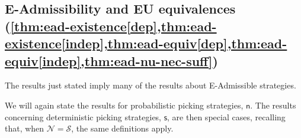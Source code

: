 \documentclass[a4paper,final]{article}
\renewcommand\S{\mathcal{S}}
\newcommand\s{\mathsf{s}}
\newcommand{\n}{\mathsf{n}}
\renewcommand{\nu}{\n}
\newcommand\Nu{\mathcal{N}}
\renewcommand{\color}[1]{}
\newenvironment{colored}[1]{\leavevmode\color{#1}}{}
\newenvironment{CCM rewritten}
{\begingroup\color{blue}} %
{\endgroup}              %
\begin{document}
\subsection{E-Admissibility and EU equivalences\\  (\cref{thm:ead-existence[dep],thm:ead-existence[indep],thm:ead-equiv[dep],thm:ead-equiv[indep],thm:ead-nu-nec-suff})}\label{sect:EAd-EU-appendix}
The results just stated imply many of the results about E-Admissible strategies.

We will again state the results for probabilistic picking strategies, $\nu$. The results concerning deterministic picking strategies, $\s$, are then special cases, recalling that, when $\Nu=\S$, the same definitions apply.
 
\end{document}

